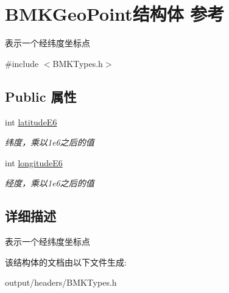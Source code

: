 \hypertarget{struct_b_m_k_geo_point}{}\section{B\+M\+K\+Geo\+Point结构体 参考}
\label{struct_b_m_k_geo_point}


表示一个经纬度坐标点  




{\ttfamily \#include $<$B\+M\+K\+Types.\+h$>$}

\subsection*{Public 属性}
\begin{DoxyCompactItemize}
\item 
\hypertarget{struct_b_m_k_geo_point_ad6f5b38335cff314e953e9b7eb5c7b39}{}int \hyperlink{struct_b_m_k_geo_point_ad6f5b38335cff314e953e9b7eb5c7b39}{latitude\+E6}\label{struct_b_m_k_geo_point_ad6f5b38335cff314e953e9b7eb5c7b39}

\begin{DoxyCompactList}\small\item\em 纬度，乘以1e6之后的值 \end{DoxyCompactList}\item 
\hypertarget{struct_b_m_k_geo_point_aac3f3dc0ae09785e5b70c319b68d4047}{}int \hyperlink{struct_b_m_k_geo_point_aac3f3dc0ae09785e5b70c319b68d4047}{longitude\+E6}\label{struct_b_m_k_geo_point_aac3f3dc0ae09785e5b70c319b68d4047}

\begin{DoxyCompactList}\small\item\em 经度，乘以1e6之后的值 \end{DoxyCompactList}\end{DoxyCompactItemize}


\subsection{详细描述}
表示一个经纬度坐标点 

该结构体的文档由以下文件生成\+:\begin{DoxyCompactItemize}
\item 
output/headers/B\+M\+K\+Types.\+h\end{DoxyCompactItemize}
